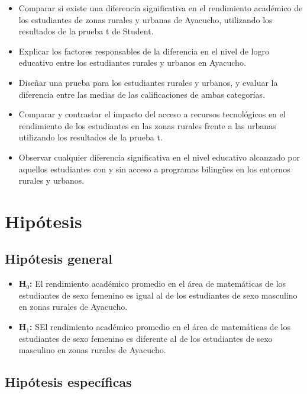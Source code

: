\documentclass[
]{article}
\begin{document}
\begin{itemize}
    \item Comparar si existe una diferencia significativa en el rendimiento académico de los estudiantes de zonas rurales y urbanas de Ayacucho, utilizando los resultados de la prueba t de Student.
    \item Explicar los factores responsables de la diferencia en el nivel de logro educativo entre los estudiantes rurales y urbanos en Ayacucho.
    \item Diseñar una prueba para los estudiantes rurales y urbanos, y evaluar la diferencia entre las medias de las calificaciones de ambas categorías.
    \item Comparar y contrastar el impacto del acceso a recursos tecnológicos en el rendimiento de los estudiantes en las zonas rurales frente a las urbanas utilizando los resultados de la prueba t.
    \item Observar cualquier diferencia significativa en el nivel educativo alcanzado por aquellos estudiantes con y sin acceso a programas bilingües en los entornos rurales y urbanos.
\end{itemize}

\section*{Hipótesis}\label{hipuxf3tesis}

\subsection*{Hipótesis general}\label{hipuxf3tesis-general}

\begin{itemize}
    \item \textbf{H$_{0}$:} El rendimiento académico promedio en el área de matemáticas de los estudiantes de sexo femenino es igual al de los estudiantes de sexo masculino en zonas rurales de Ayacucho.

  \item \textbf{H$_{1}$:} SEl rendimiento académico promedio en el área de matemáticas de los estudiantes de sexo femenino es diferente al de los estudiantes de sexo masculino en zonas rurales de Ayacucho.

\end{itemize}

\subsection*{Hipótesis específicas}\label{hipuxf3tesis-especuxedficas}
\end{document}
